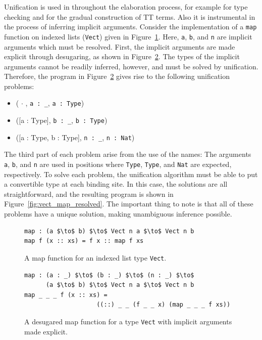 Unification is used in throughout the elaboration process, for example for type checking
and for the gradual construction of TT terms. Also it is instrumental in the
process of inferring implicit arguments. Consider the implementation of a
\texttt{map} function on indexed lists (\texttt{Vect}) given in
Figure~\ref{fig:vect_map}. Here, \texttt{a}, \texttt{b}, and \texttt{n} are
implicit arguments which must be resolved. First, the implicit arguments are
made explicit through desugaring, as shown in
Figure~\ref{fig:vect_map_desugared}. The types of the implicit arguments cannot
be readily inferred, however, and must be solved by unification. Therefore, the
program in Figure~\ref{fig:vect_map_desugared} gives rise to the following
unification problems:
\begin{itemize}
\item ($\,\cdot\,$, \texttt{a : \_}, \texttt{a : Type})
\item ([a : Type], \texttt{b : \_}, \texttt{b : Type})
\item ([a : Type, b : Type], \texttt{n : \_}, \texttt{n : Nat})
\end{itemize}
The third part of each problem arise from the use of the names: The arguments
\texttt{a}, \texttt{b}, and \texttt{n} are used in positions where
\texttt{Type}, \texttt{Type}, and \texttt{Nat} are expected, respectively. To
solve each problem, the unification algorithm must be able to put a convertible
type at each binding site. In this case, the solutions are all straightforward,
and the resulting program is shown in Figure~\ref{fig:vect_map_resolved}. The
important thing to note is that all of these problems have a unique solution,
making unambiguous inference possible.

\begin{figure}
\begin{lstlisting}[mathescape]
map : (a $\to$ b) $\to$ Vect n a $\to$ Vect n b
map f (x :: xs) = f x :: map f xs
\end{lstlisting}
  \caption{A map function for an indexed list type \texttt{Vect}.}
  \label{fig:vect_map}
\end{figure}

\begin{figure}
\begin{lstlisting}[mathescape]
map : (a : _) $\to$ (b : _) $\to$ (n : _) $\to$ 
      (a $\to$ b) $\to$ Vect n a $\to$ Vect n b
map _ _ _ f (x :: xs) = 
                    ((::) _ _ (f _ _ x) (map _ _ _ f xs))
\end{lstlisting}
  \caption{A desugared map function for a type \texttt{Vect} with implicit
    arguments made explicit.}
  \label{fig:vect_map_desugared}
\end{figure}

